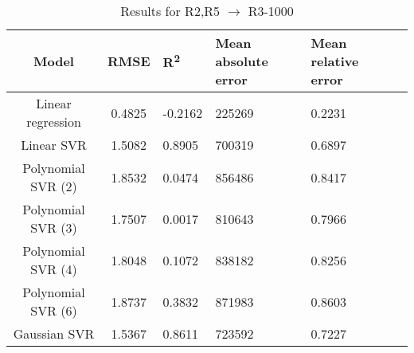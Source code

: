 \begin{table}[H]
\centering
\begin{adjustbox}{center}
\begin{tabular}{c | c M{1.2cm} M{2.5cm} M{2.5cm} M{1.8cm}}
Model & RMSE & R\textsuperscript{2} & Mean absolute error & Mean relative error \tabularnewline
\hline
Linear regression & 0.4825 & -0.2162 & 225269 & 0.2231 \\
Linear SVR & 1.5082 & 0.8905 & 700319 & 0.6897 \\
Polynomial SVR (2) & 1.8532 & 0.0474 & 856486 & 0.8417 \\
Polynomial SVR (3) & 1.7507 & 0.0017 & 810643 & 0.7966 \\
Polynomial SVR (4) & 1.8048 & 0.1072 & 838182 & 0.8256 \\
Polynomial SVR (6) & 1.8737 & 0.3832 & 871983 & 0.8603 \\
Gaussian SVR & 1.5367 & 0.8611 & 723592 & 0.7227 \\
\end{tabular}
\end{adjustbox}
\\
\caption{Results for R2,R5 $\rightarrow$ R3-1000}
\label{tab:coreonly_linear_R2,R5_R3_1000}
\end{table}
